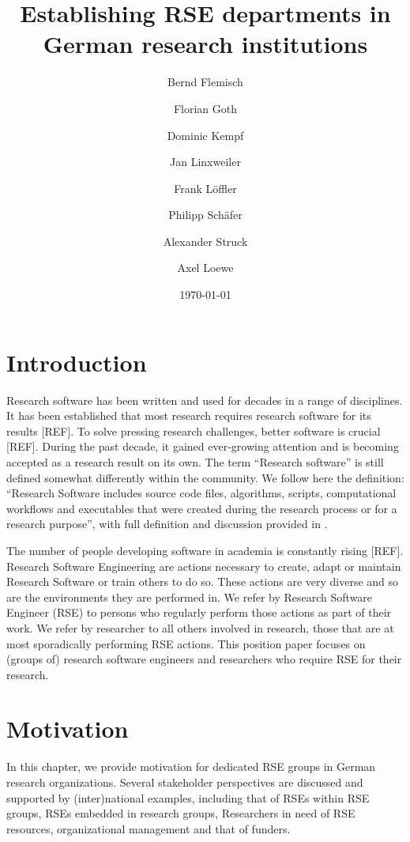 \documentclass{article}
\title{Establishing RSE departments in German research institutions}
\author{
    Bernd Flemisch
    \and
    Florian Goth
    \and
    Dominic Kempf
    \and
    Jan Linxweiler
    \and
    Frank Löffler
    \and
    Philipp Schäfer
    \and
    Alexander Struck
    \and
    Axel Loewe
}
\date{\today}
\begin{document}
\maketitle

\section{Introduction}
Research software has been written and used for decades in a range of disciplines.
It has been established that most research requires research software for its results [REF].
To solve pressing research challenges, better software is crucial [REF].
During the past decade, it gained ever-growing attention and is becoming accepted as a research result on its own.
The term “Research software” is still defined somewhat differently within the community.
We follow here the definition: “Research Software includes source code files, algorithms, scripts, computational workflows and executables that were created during the research process or for a research purpose”, with full definition and discussion provided in \autocite{Gruenpeter2021}.

The number of people developing software in academia is constantly rising [REF].
Research Software Engineering are actions necessary to create, adapt or maintain Research Software or train others to do so.
These actions are very diverse and so are the environments they are performed in.
We refer by Research Software Engineer (RSE) to persons who regularly perform those actions as part of their work.
We refer by researcher to all others involved in research, those that are at most sporadically performing RSE actions.
This position paper focuses on (groups of) research software engineers and researchers who require RSE for their research.

\section{Motivation}

In this chapter, we provide motivation for dedicated RSE groups in German research organizations.
Several stakeholder perspectives are discussed and supported by (inter)national examples, including that of RSEs within RSE groups, RSEs embedded in research groups, Researchers in need of RSE resources, organizational management and that of funders.
\end{document}
